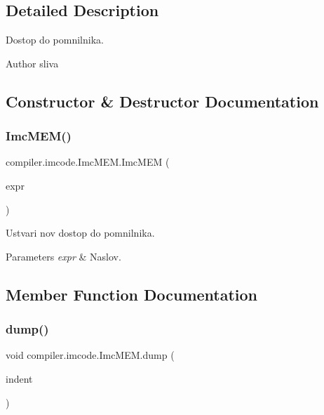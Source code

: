 \subsection{Detailed Description}
Dostop do pomnilnika.

\begin{DoxyAuthor}{Author}
sliva 
\end{DoxyAuthor}


\subsection{Constructor \& Destructor Documentation}
\mbox{\label{classcompiler_1_1imcode_1_1_imc_m_e_m_a78a40ab0e139360b2a5898f1a4c31f32}} 
\subsubsection{\texorpdfstring{Imc\+M\+E\+M()}{ImcMEM()}}
{\footnotesize\ttfamily compiler.\+imcode.\+Imc\+M\+E\+M.\+Imc\+M\+EM (\begin{DoxyParamCaption}\item[{\hyperlink{classcompiler_1_1imcode_1_1_imc_expr}{Imc\+Expr}}]{expr }\end{DoxyParamCaption})}

Ustvari nov dostop do pomnilnika.


\begin{DoxyParams}{Parameters}
{\em expr} & Naslov. \\
\hline
\end{DoxyParams}


\subsection{Member Function Documentation}
\mbox{\label{classcompiler_1_1imcode_1_1_imc_m_e_m_a74d96d8a02c82c7d2aa8e2b965d5e557}} 
\subsubsection{\texorpdfstring{dump()}{dump()}}
{\footnotesize\ttfamily void compiler.\+imcode.\+Imc\+M\+E\+M.\+dump (\begin{DoxyParamCaption}\item[{int}]{indent }\end{DoxyParamCaption})}

